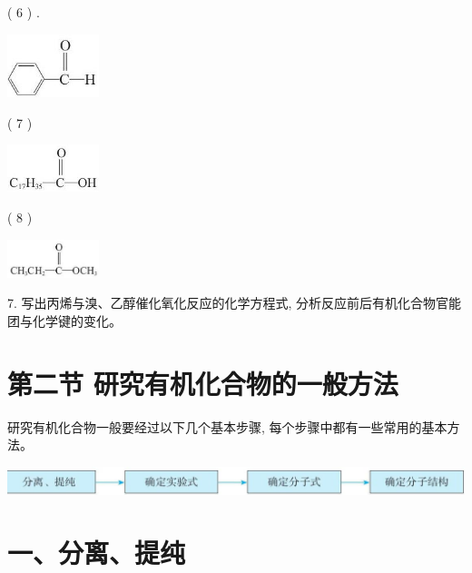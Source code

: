 \documentclass[10pt]{article}
\begin{document}
( 6 ) .

\begin{center}
\includegraphics[max width=0.2\textwidth]{images/0190efc5-b58a-7c43-bfb0-e0a030df9cfd_17_949943.jpg}
\end{center}

( 7 )

\begin{center}
\includegraphics[max width=0.2\textwidth]{images/0190efc5-b58a-7c43-bfb0-e0a030df9cfd_17_962843.jpg}
\end{center}

( 8 )

\begin{center}
\includegraphics[max width=0.2\textwidth]{images/0190efc5-b58a-7c43-bfb0-e0a030df9cfd_17_367846.jpg}
\end{center}

7. 写出丙烯与溴、乙醇催化氧化反应的化学方程式, 分析反应前后有机化合物官能团与化学键的变化。

\section*{第二节 研究有机化合物的一般方法}

研究有机化合物一般要经过以下几个基本步骤, 每个步骤中都有一些常用的基本方法。

\begin{center}
\includegraphics[max width=1.0\textwidth]{images/0190efc5-b58a-7c43-bfb0-e0a030df9cfd_18_808361.jpg}
\end{center}

\section*{一、分离、提纯}
\end{document}

